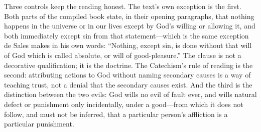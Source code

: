 Three controls keep the reading honest. The text's own exception is the first. Both parts of the compiled book state, in their opening paragraphs, that nothing happens in the universe or in our lives except by God's willing or allowing it, and both immediately except sin from that statement---which is the same exception de Sales makes in his own words: ``Nothing, except sin, is done without that will of God which is called absolute, or will of good-pleasure.'' The clause is not a decorative qualification; it is the doctrine. The Catechism's rule of reading is the second: attributing actions to God without naming secondary causes is a way of teaching trust, not a denial that the secondary causes exist. And the third is the distinction between the two evils: God wills no evil of fault ever, and wills natural defect or punishment only incidentally, under a good---from which it does not follow, and must not be inferred, that a particular person's affliction is a particular punishment.
